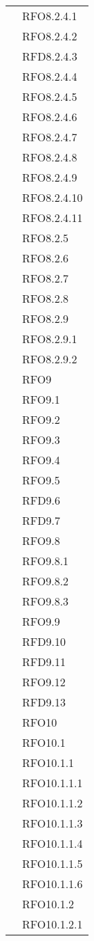 \begin{longtable}{ p{12cm} | p{4cm} }
			& RFO8.2.4.1 \\
			& RFO8.2.4.2 \\
			& RFD8.2.4.3 \\
			& RFO8.2.4.4 \\
			& RFO8.2.4.5 \\
			& RFO8.2.4.6 \\
			& RFO8.2.4.7 \\
			& RFO8.2.4.8 \\
			& RFO8.2.4.9 \\
			& RFO8.2.4.10 \\
			& RFO8.2.4.11 \\
			& RFO8.2.5 \\
			& RFO8.2.6 \\
			& RFO8.2.7 \\
			& RFO8.2.8 \\
			& RFO8.2.9 \\
			& RFO8.2.9.1 \\
			& RFO8.2.9.2 \\
			& RFO9 \\
			& RFO9.1 \\
			& RFO9.2 \\
			& RFO9.3 \\
			& RFO9.4 \\
			& RFO9.5 \\
			& RFD9.6 \\
			& RFD9.7 \\
			& RFO9.8 \\
			& RFO9.8.1 \\
			& RFO9.8.2 \\
			& RFO9.8.3 \\
			& RFO9.9 \\
			& RFD9.10 \\
			& RFD9.11 \\
			& RFO9.12 \\
			& RFD9.13 \\
			& RFO10 \\
			& RFO10.1 \\
			& RFO10.1.1 \\
			& RFO10.1.1.1 \\
			& RFO10.1.1.2 \\
			& RFO10.1.1.3 \\
			& RFO10.1.1.4 \\
			& RFO10.1.1.5 \\
			& RFO10.1.1.6 \\
			& RFO10.1.2 \\
			& RFO10.1.2.1 \\

\end{longtable}
